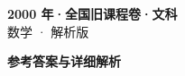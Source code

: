 \documentclass[zihao=-4, a4paper]{ctexart}
\begin{document}
\begin{center}
  {\Large\bfseries 2000 年·全国旧课程卷·文科}\\[4pt]
  {\large 数学 · 解析版}
\end{center}
\medskip
{}

\clearpage
{}
\begin{center}{\Large\bfseries 参考答案与详细解析}\end{center}
\medskip

\end{document}
